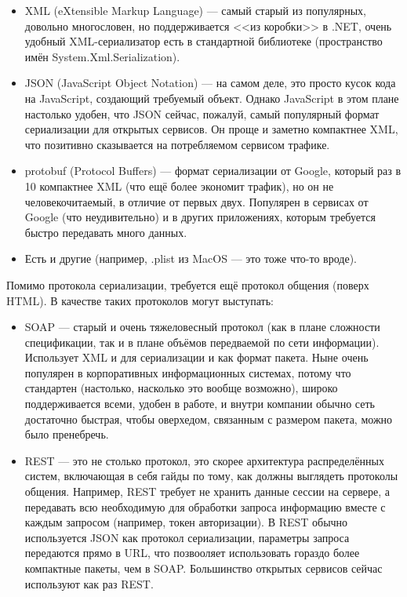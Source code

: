 \documentclass[a5paper]{article}
\begin{document}
\begin{itemize}
    \item XML (eXtensible Markup Language) --- самый старый из популярных, довольно многословен, но поддерживается <<из коробки>> в .NET, очень удобный XML-сериализатор есть в стандартной библиотеке (пространство имён System.Xml.Serialization).
    \item JSON (JavaScript Object Notation) --- на самом деле, это просто кусок кода на JavaScript, создающий требуемый объект. Однако JavaScript в этом плане настолько удобен, что JSON сейчас, пожалуй, самый популярный формат сериализации для открытых сервисов. Он проще и заметно компактнее XML, что позитивно сказывается на потребляемом сервисом трафике.
    \item protobuf (Protocol Buffers) --- формат сериализации от Google, который раз в 10 компактнее XML (что ещё более экономит трафик), но он не человекочитаемый, в отличие от первых двух. Популярен в сервисах от Google (что неудивительно) и в других приложениях, которым требуется быстро передавать много данных.
    \item Есть и другие (например, .plist из MacOS --- это тоже что-то вроде).
\end{itemize}

Помимо протокола сериализации, требуется ещё протокол общения (поверх HTML). В качестве таких протоколов могут выступать:

\begin{itemize}
    \item SOAP --- старый и очень тяжеловесный протокол (как в плане сложности спецификации, так и в плане объёмов передваемой по сети информации). Использует XML и для сериализации и как формат пакета. Ныне очень популярен в корпоративных информационных системах, потому что стандартен (настолько, насколько это вообще возможно), широко поддерживается всеми, удобен в работе, и внутри компании обычно сеть достаточно быстрая, чтобы оверхедом, связанным с размером пакета, можно было пренебречь.
    \item REST --- это не столько протокол, это скорее архитектура распределённых систем, включающая в себя гайды по тому, как должны выглядеть протоколы общения. Например, REST требует не хранить данные сессии на сервере, а передавать всю необходимую для обработки запроса информацию вместе с каждым запросом (например, токен авторизации). В REST обычно используется JSON как протокол сериализации, параметры запроса передаются прямо в URL, что позвооляет использовать гораздо более компактные пакеты, чем в SOAP. Большинство открытых сервисов сейчас используют как раз REST.
\end{itemize}
\end{document}
